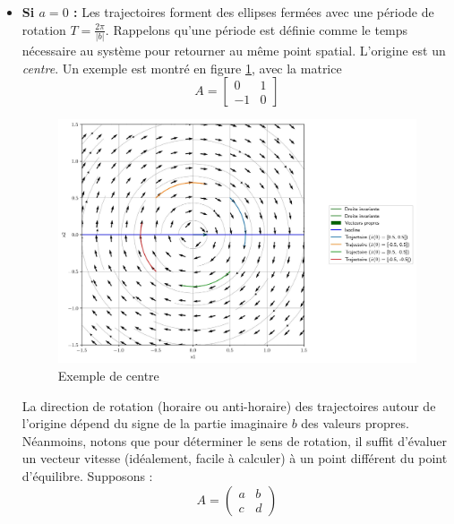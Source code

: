             \begin{itemize}
                \item \textbf{Si $a = 0$ :} Les trajectoires forment des ellipses fermées avec une période de rotation $T = \frac{2 \pi}{|b|}$. Rappelons qu'une période est définie comme le temps nécessaire au système pour retourner au même point spatial. L'origine est un \textit{centre}. Un exemple est montré en figure \ref{fig:centre}, avec la matrice
                \begin{equation}
                    A = \begin{bmatrix} 0 & 1 \\ -1 & 0 \end{bmatrix}
                \end{equation}
                \begin{figure}[ht!]
                    \centering
                    \includegraphics[width=\textwidth]{images/centre.jpg}
                    \caption{Exemple de centre}
                    \label{fig:centre}
                \end{figure}

                La direction de rotation (horaire ou anti-horaire) des trajectoires autour de l'origine dépend du signe de la partie imaginaire $b$ des valeurs propres.
                Néanmoins, notons que pour déterminer le sens de rotation, il suffit d'évaluer un vecteur vitesse (idéalement, facile à calculer) à un point différent du point d'équilibre. Supposons :
                \begin{equation}
                A = \begin{pmatrix}
                a & b \\
                c & d
                \end{pmatrix}
                \end{equation}
                

\end{itemize}
